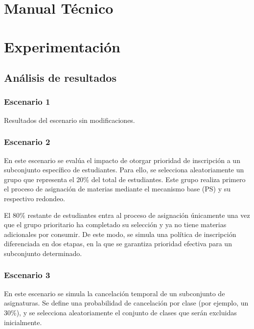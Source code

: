 \documentclass{article}
\begin{document}
\section{Manual Técnico}\label{sec:man_t}



\section{Experimentación}\label{sec:exp}

\subsection{Análisis de resultados}

\subsubsection{Escenario 1}

Resultados del escenario sin modificaciones.


\subsubsection{Escenario 2}

En este escenario se evalúa el impacto de otorgar prioridad de inscripción a un subconjunto 
específico de estudiantes. Para ello, se selecciona aleatoriamente un grupo que representa el 
20\% del total de estudiantes. Este grupo realiza primero el proceso de asignación de materias 
mediante el mecanismo base (PS) y su respectivo redondeo.

El 80\% restante de estudiantes entra al proceso de asignación únicamente una vez que el grupo 
prioritario ha completado su selección y ya no tiene materias adicionales por consumir. 
De este modo, se simula una política de inscripción diferenciada en dos etapas, en la que se 
garantiza prioridad efectiva para un subconjunto determinado.

\subsubsection{Escenario 3}

En este escenario se simula la cancelación temporal de un subconjunto de asignaturas. Se define 
una probabilidad de cancelación por clase (por ejemplo, un 30\%), y se selecciona aleatoriamente 
el conjunto de clases que serán excluidas inicialmente.
\end{document}
